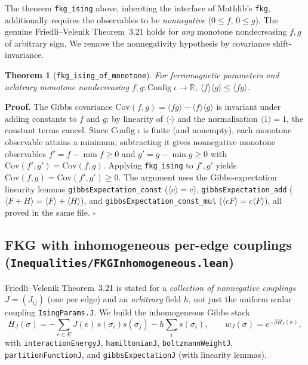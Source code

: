 \documentclass[a4paper,11pt]{article}
\newtheorem{theorem}{Theorem}
\begin{document}
The theorem \texttt{fkg\_ising} above, inheriting the interface of Mathlib's
\texttt{fkg}, additionally requires the observables to be \emph{nonnegative}
($0 \le f$, $0 \le g$). The genuine Friedli--Velenik Theorem~3.21 holds for
\emph{any} monotone nondecreasing $f, g$ of arbitrary sign. We remove the
nonnegativity hypothesis by covariance shift-invariance.

\begin{theorem}[\texttt{fkg\_ising\_of\_monotone}]
For ferromagnetic parameters and \emph{arbitrary} monotone nondecreasing
$f, g : \mathrm{Config}\;\iota \to \mathbb{R}$,
$\langle f \rangle \langle g \rangle \le \langle fg \rangle$.
\end{theorem}

\noindent\textbf{Proof.} The Gibbs covariance
$\mathrm{Cov}(f, g) = \langle fg \rangle - \langle f \rangle\langle g \rangle$
is invariant under adding constants to $f$ and $g$: by linearity of
$\langle \cdot \rangle$ and the normalisation $\langle 1 \rangle = 1$, the
constant terms cancel. Since $\mathrm{Config}\;\iota$ is finite (and nonempty),
each monotone observable attains a minimum; subtracting it gives nonnegative
monotone observables $f' = f - \min f \ge 0$ and $g' = g - \min g \ge 0$ with
$\mathrm{Cov}(f', g') = \mathrm{Cov}(f, g)$. Applying \texttt{fkg\_ising} to
$f', g'$ yields $\mathrm{Cov}(f, g) = \mathrm{Cov}(f', g') \ge 0$. The argument
uses the Gibbs-expectation linearity lemmas \texttt{gibbsExpectation\_const}
($\langle c \rangle = c$), \texttt{gibbsExpectation\_add}
($\langle F + H \rangle = \langle F \rangle + \langle H \rangle$), and
\texttt{gibbsExpectation\_const\_mul} ($\langle cF \rangle = c\langle F \rangle$),
all proved in the same file. \hfill$\square$

\subsection{FKG with inhomogeneous per-edge couplings
(\texttt{Inequalities/FKGInhomogeneous.lean})}

Friedli--Velenik Theorem~3.21 is stated for a \emph{collection of nonnegative
couplings} $J = (J_{ij})$ (one per edge) and an \emph{arbitrary} field $h$, not
just the uniform scalar coupling \texttt{IsingParams.J}. We build the
inhomogeneous Gibbs stack
\[
  H_J(\sigma) = -\sum_{e \in E} J(e)\, s(\sigma_i) s(\sigma_j)
                - h \sum_i s(\sigma_i),
  \qquad w_J(\sigma) = e^{-\beta H_J(\sigma)},
\]
with \texttt{interactionEnergyJ}, \texttt{hamiltonianJ}, \texttt{boltzmannWeightJ},
\texttt{partitionFunctionJ}, and \texttt{gibbsExpectationJ} (with linearity
lemmas).
\end{document}
